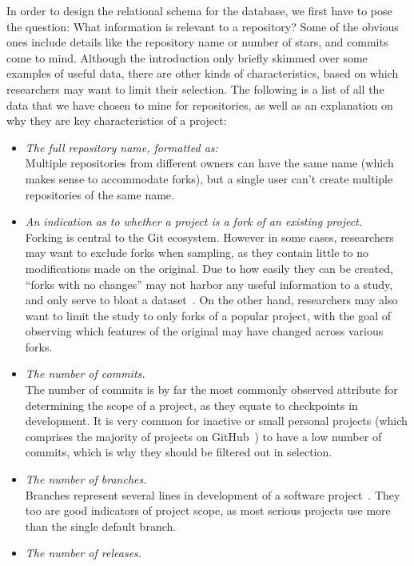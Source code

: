 In order to design the relational schema for the database, we first have to pose the question: What information is relevant to a repository?
Some of the obvious ones include details like the repository name or number of stars, and commits come to mind.
Although the introduction only briefly skimmed over some examples of useful data, there are other kinds of characteristics, based on which researchers may want to limit their selection.
The following is a list of all the data that we have chosen to mine for repositories, as well as an explanation on why they are key characteristics of a project:
\begin{itemize}
    \item \textit{The full repository name, formatted as:} 
    \\Multiple repositories from different owners can have the same name (which makes sense to accommodate forks), but a single user can't create multiple repositories of the same name.
    \item \textit{An indication as to whether a project is a fork of an existing project.}
    \\Forking is central to the Git ecosystem. However in some cases, researchers may want to exclude forks when sampling, as they contain little to no modifications made on the original. Due to how easily they can be created, ``forks with no changes'' may not harbor any useful information to a study, and only serve to bloat a dataset~\cite{FORKS}. On the other hand, researchers may also want to limit the study to only forks of a popular project, with the goal of observing which features of the original may have changed across various forks.
    \item \textit{The number of commits.}
    \\The number of commits is by far the most commonly observed attribute for determining the scope of a project, as they equate to checkpoints in development. It is very common for inactive or small personal projects (which comprises the majority of projects on GitHub~\cite{COMMITS}) to have a low number of commits, which is why they should be filtered out in selection.
    \item \textit{The number of branches.}
    \\Branches represent several lines in development of a software project~\cite{GIT}. They too are good indicators of project scope, as most serious projects use more than the single default branch.
    \item \textit{The number of releases.}

\end{itemize}
